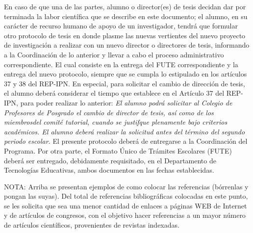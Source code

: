 \documentclass[runningheads,a4paper]{llncs}
\begin{document}
En caso de que una de las partes, alumno o director(es) de tesis decidan dar por
terminada la labor científica que se describe en este documento; el alumno, en
su carácter de recurso humano de apoyo de un investigador, tendrá que formular
otro protocolo de tesis en donde plasme las nuevas vertientes del nuevo proyecto
de investigación a realizar con un nuevo director o directores de tesis,
informando a la Coordinación de lo anterior y llevar a cabo el proceso
administrativo correspondiente. El cual consiste en la entrega del FUTE
correspondiente y la entrega del nuevo protocolo, siempre que se cumpla lo
estipulado en los artículos 37 y 38 del REP-IPN. En especial, para solicitar el
cambio de dirección de tesis, el alumno deberá considerar el tiempo que
establece en el Artículo 37 del REP-IPN, para poder realizar lo anterior:
\newline
\newline
\emph{El alumno podrá solicitar al Colegio de Profesores de Posgrado el cambio
de director de tesis, así como de los miembrosdel comité tutorial, cuando se
justifque plenamente bajo criterios académicos. El alumno deberá realizar la
solicitud antes del término del segundo periodo escolar.}
\newline
\newline
El presente protocolo deberá de entregarse a la Coordinación del Programa. Por
otra parte, el Formato Único de Trámites Escolares (FUTE) deberá ser entregado,
debidamente requisitado, en el Departamento de Tecnologías Educativas, ambos
documentos en las fechas establecidas.


NOTA: Arriba se presentan ejemplos de como colocar las referencias (bórrenlas y
pongan las suyas). Del total de referencias bibliográficas colocadas en este
punto, se les solicita que sea una menor cantidad de enlaces a páginas WEB de
Internet y de artículos de congresos, con el objetivo hacer referencias a un
mayor número de artículos científicos, provenientes de revistas indexadas. 

\pagebreak
 

\end{document}
